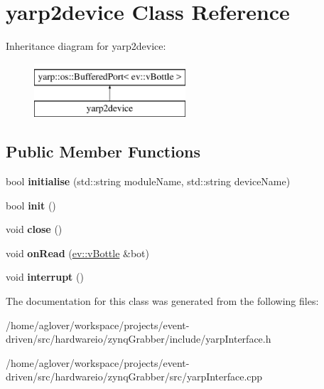 \hypertarget{classyarp2device}{}\section{yarp2device Class Reference}
\label{classyarp2device}
Inheritance diagram for yarp2device\+:\begin{figure}[H]
\begin{center}
\leavevmode
\includegraphics[height=2.000000cm]{classyarp2device}
\end{center}
\end{figure}
\subsection*{Public Member Functions}
\begin{DoxyCompactItemize}
\item 
bool {\bfseries initialise} (std\+::string module\+Name, std\+::string device\+Name)\hypertarget{classyarp2device_ab25c91e26d75cad2b01544040aa46b7b}{}\label{classyarp2device_ab25c91e26d75cad2b01544040aa46b7b}

\item 
bool {\bfseries init} ()\hypertarget{classyarp2device_a56b9560746d5dec6168f62426b302598}{}\label{classyarp2device_a56b9560746d5dec6168f62426b302598}

\item 
void {\bfseries close} ()\hypertarget{classyarp2device_a4031dba4c05576ca4f444fe496fd1f42}{}\label{classyarp2device_a4031dba4c05576ca4f444fe496fd1f42}

\item 
void {\bfseries on\+Read} (\hyperlink{classev_1_1vBottle}{ev\+::v\+Bottle} \&bot)\hypertarget{classyarp2device_a52d2819114122ec00c41b31b2842c608}{}\label{classyarp2device_a52d2819114122ec00c41b31b2842c608}

\item 
void {\bfseries interrupt} ()\hypertarget{classyarp2device_ad2c4ae1fdb9839805c806d0084fdd20a}{}\label{classyarp2device_ad2c4ae1fdb9839805c806d0084fdd20a}

\end{DoxyCompactItemize}


The documentation for this class was generated from the following files\+:\begin{DoxyCompactItemize}
\item 
/home/aglover/workspace/projects/event-\/driven/src/hardwareio/zynq\+Grabber/include/yarp\+Interface.\+h\item 
/home/aglover/workspace/projects/event-\/driven/src/hardwareio/zynq\+Grabber/src/yarp\+Interface.\+cpp\end{DoxyCompactItemize}
